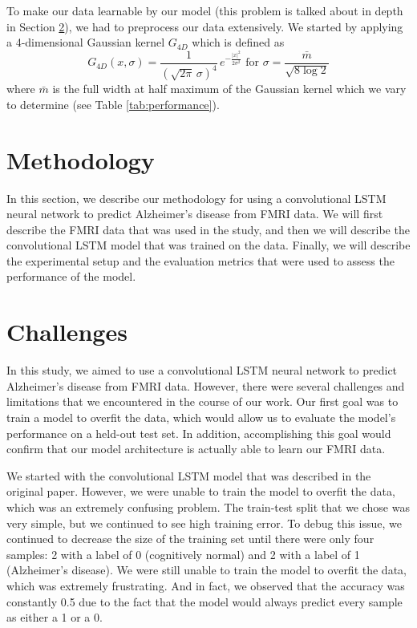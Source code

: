 \documentclass[10pt]{article}
\begin{document}
	To make our data learnable by our model (this problem is talked about in depth in Section \ref{sec:challenges}), we had to preprocess our data extensively. We started by applying a 4-dimensional Gaussian kernel $G_{4D}$ which is defined as 
	$$G_{4D}\left(x,\sigma\right)=\frac{1}{\left(\sqrt{2\pi}\,\sigma\right)^4}\,e^{-\frac{|x|^2}{2\sigma^2}}\text{ for }\sigma=\frac{\bar{m}}{\sqrt{8\log2}}$$
	where $\bar{m}$ is the full width at half maximum of the Gaussian kernel which we vary to determine (see Table \ref{tab:performance}).
	
	
	\section{Methodology}

	In this section, we describe our methodology for using a convolutional LSTM neural network to predict Alzheimer's disease from FMRI data. We will first describe the FMRI data that was used in the study, and then we will describe the convolutional LSTM model that was trained on the data. Finally, we will describe the experimental setup and the evaluation metrics that were used to assess the performance of the model.

	\section{Challenges}
	\label{sec:challenges}

	In this study, we aimed to use a convolutional LSTM neural network to predict Alzheimer's disease from FMRI data. However, there were several challenges and limitations that we encountered in the course of our work. Our first goal was to train a model to overfit the data, which would allow us to evaluate the model's performance on a held-out test set. In addition, accomplishing this goal would confirm that our model architecture is actually able to learn our FMRI data.

	We started with the convolutional LSTM model that was described in the original paper. However, we were unable to train the model to overfit the data, which was an extremely confusing problem. The train-test split that we chose was very simple, but we continued to see high training error. To debug this issue, we continued to decrease the size of the training set until there were only four samples: 2 with a label of 0 (cognitively normal) and 2 with a label of 1 (Alzheimer's disease). We were still unable to train the model to overfit the data, which was extremely frustrating. And in fact, we observed that the accuracy was constantly 0.5 due to the fact that the model would always predict every sample as either a 1 or a 0.
\end{document}
